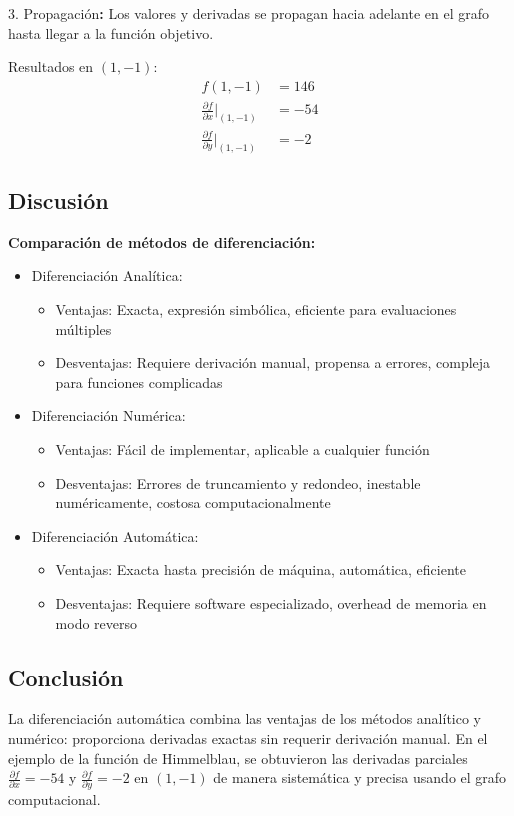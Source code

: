 \documentclass{article}
\begin{document}
3. Propagación\textbf{:} Los valores y derivadas se propagan hacia adelante en el grafo hasta llegar a la función objetivo.

Resultados en $(1,-1)$:
\begin{align}
f(1,-1) &= 146 \\
\frac{\partial f}{\partial x}\bigg|_{(1,-1)} &= -54 \\
\frac{\partial f}{\partial y}\bigg|_{(1,-1)} &= -2
\end{align}

\subsection{Discusión}

\textbf{Comparación de métodos de diferenciación:}

\begin{itemize}
    \item Diferenciación Analítica: 
        \begin{itemize}
            \item Ventajas: Exacta, expresión simbólica, eficiente para evaluaciones múltiples
            \item Desventajas: Requiere derivación manual, propensa a errores, compleja para funciones complicadas
        \end{itemize}
    
    \item Diferenciación Numérica:
        \begin{itemize}
            \item Ventajas: Fácil de implementar, aplicable a cualquier función
            \item Desventajas: Errores de truncamiento y redondeo, inestable numéricamente, costosa computacionalmente
        \end{itemize}
    
    \item Diferenciación Automática:
        \begin{itemize}
            \item Ventajas: Exacta hasta precisión de máquina, automática, eficiente
            \item Desventajas: Requiere software especializado, overhead de memoria en modo reverso
        \end{itemize}
\end{itemize}

\subsection{Conclusión}

La diferenciación automática combina las ventajas de los métodos analítico y numérico: proporciona derivadas exactas sin requerir derivación manual. En el ejemplo de la función de Himmelblau, se obtuvieron las derivadas parciales $\frac{\partial f}{\partial x} = -54$ y $\frac{\partial f}{\partial y} = -2$ en $(1,-1)$ de manera sistemática y precisa usando el grafo computacional.
\end{document}

